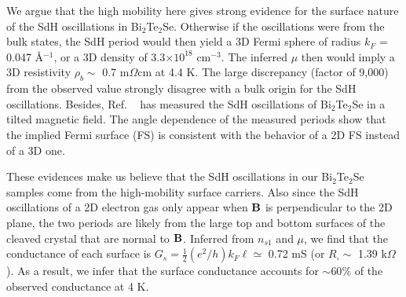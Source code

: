 We argue that the high mobility here gives strong evidence for the surface nature of the SdH oscillations in Bi$_2$Te$_2$Se. Otherwise if the oscillations were from the bulk states, the SdH period would then yield a 3D Fermi sphere of radius $k_F$ = 0.047 \AA$^{-1}$, or a 3D density of 3.3$\times 10^{18}$ cm$^{-3}$.  The inferred $\mu$ then would imply a 3D resistivity $\rho_b \sim$ 0.7 m$\Omega$cm at 4.4 K. The large discrepancy (factor of 9,000) from the observed value strongly disagree with a bulk origin for the SdH oscillations. Besides, Ref. ~\cite{Ando10} has measured the SdH oscillations of Bi$_2$Te$_2$Se in a tilted magnetic field. The angle dependence of the measured periods show that the implied Fermi surface (FS) is consistent with the behavior of a 2D FS instead of a 3D one.

These evidences make us believe that the SdH oscillations in our Bi$_2$Te$_2$Se samples come from the high-mobility surface carriers. Also since the SdH oscillations of a 2D electron gas only appear when $\bf B$ is perpendicular to the 2D plane, the two periods are likely from the large top and bottom surfaces of the cleaved crystal that are normal to $\bf B$.  Inferred from $n_{s1}$ and $\mu$, we find
that the conductance of each surface is $G_s = \frac12(e^2/h)k_F\ell \simeq$ 0.72 mS (or $R_{\square}\sim$ 1.39 k$\Omega$). As a result, we infer that the surface conductance accounts for $\sim 60\%$ of the observed conductance at 4 K. 






